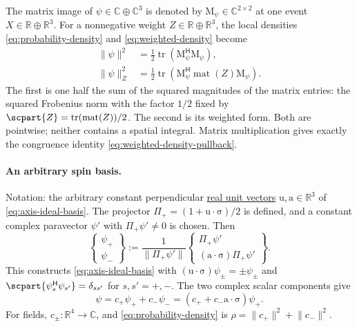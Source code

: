 \documentclass[11pt]{article}
\newcommand{\pv}[1]{{#1}}
\newcommand{\pvGreek}[1]{{#1}}
\newcommand{\vstyle}[1]{{\bm{\mathrm{#1}}}}
\newcommand{\pX}{\pv{X}}
\newcommand{\pZ}{\pv{Z}}
\newcommand{\pvPi}{\pvGreek{\Pi}}
\newcommand{\pvpsi}{\pvGreek{\psi}}
\numberwithin{equation}{section}
\newcommand{\R}{\mathbb{R}}
\newcommand{\C}{\mathbb{C}}
\newcommand{\dotprod}{\cdot}
\newcommand{\bsig}{\vstyle{\sigma}}
\newcommand{\bu}{\vstyle{u}}
\newcommand{\ba}{\vstyle{a}}
\newcommand{\bM}{\vstyle{M}}
\begin{document}
The matrix image of $\pvpsi\in\C\oplus\C^3$ is denoted by
$\bM_\pvpsi\in\C^{2\times2}$ at one event $\pX\in\R\oplus\R^3$.
For a nonnegative weight $\pZ\in\R\oplus\R^3$, the local densities
\eqref{eq:probability-density} and \eqref{eq:weighted-density} become
\begin{align*}
 \lVert\pvpsi\rVert^2
 &=\tfrac12\operatorname{tr}(\bM_\pvpsi^{\mathsf H}\bM_\pvpsi),\\
 \lVert\pvpsi\rVert_\pZ^2
 &=\tfrac12\operatorname{tr}
    (\bM_\pvpsi^{\mathsf H}\operatorname{mat}(\pZ)\bM_\pvpsi).
\end{align*}
The first is one half the sum of the squared magnitudes of the matrix
entries: the squared Frobenius norm with the factor $1/2$ fixed by
$\scpart{\pZ}=\operatorname{tr}(\operatorname{mat}(\pZ))/2$.  The second is its weighted form.
Both are pointwise; neither contains a spatial integral.
Matrix multiplication gives exactly the congruence identity
\eqref{eq:weighted-density-pullback}.

\paragraph{An arbitrary spin basis.}
Notation: the arbitrary constant perpendicular
\hyperref[def:real-unit-vector]{real unit vectors}
$\bu,\ba\in\R^3$ of \eqref{eq:axis-ideal-basis}.
The projector $\pvPi_+=(1+\bu\dotprod\bsig)/2$ is defined, and a constant complex
paravector $\pvpsi'$ with $\pvPi_+\pvpsi'\ne0$ is chosen.  Then
\begin{equation}
 \begin{Bmatrix}\pvpsi_+\\\pvpsi_-\end{Bmatrix}
:=\frac1{\lVert\pvPi_+\pvpsi'\rVert}
 \begin{Bmatrix}\pvPi_+\pvpsi'\\(\ba\dotprod\bsig)\pvPi_+\pvpsi'\end{Bmatrix}.
 \label{eq:ideal-spin-basis}
\end{equation}
This constructs \eqref{eq:axis-ideal-basis} with
$(\bu\dotprod\bsig)\pvpsi_\pm=\pm\pvpsi_\pm$ and
$\scpart{\pvpsi_s^{\mathsf H}\pvpsi_{s'}}=\delta_{ss'}$ for $s,s'=+,-$.
The two complex scalar components give
\begin{equation}
 \pvpsi=c_+\pvpsi_++c_-\pvpsi_-=(c_++c_-\ba\dotprod\bsig)\pvpsi_+.
 \label{eq:ideal-components}
\end{equation}
For fields, $c_\pm:\R^4\to\C$, and
\eqref{eq:probability-density} is
$\rho=\lVert c_+\rVert^2+\lVert c_-\rVert^2$.
\end{document}
